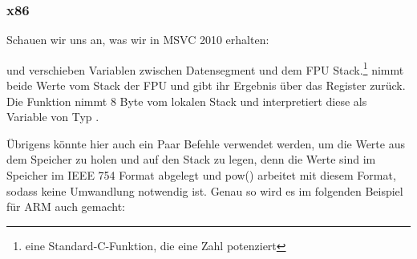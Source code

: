 \subsubsection{x86}
Schauen wir uns an, was wir in MSVC 2010 erhalten:



\FLS und \FSTP verschieben Variablen zwischen Datensegment und dem FPU
Stack.\footnote{eine Standard-C-Funktion, die eine Zahl potenziert}
nimmt beide Werte vom Stack der FPU und gibt ihr Ergebnis über das  Register zurück. 
Die Funktion \printf nimmt 8 Byte vom lokalen Stack und interpretiert diese als
Variable von Typ \Tdouble.

Übrigens könnte hier auch ein Paar \MOV Befehle verwendet werden, um die Werte
aus dem Speicher zu holen und auf den Stack zu legen, denn die Werte sind im
Speicher im IEEE 754 Format abgelegt und pow() arbeitet mit diesem Format,
sodass keine Umwandlung notwendig ist.
Genau so wird es im folgenden Beispiel für ARM auch
gemacht:
